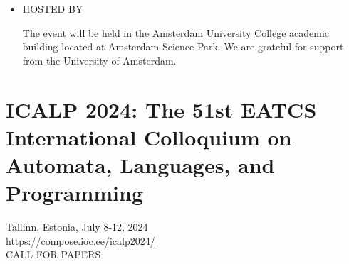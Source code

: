 \documentclass[prodmode,acmtecs]{acmsmall} %
\begin{document}
\begin{itemize}
\item  HOSTED BY 
 
  The event will be held in the Amsterdam University College academic building located at Amsterdam Science Park. We are grateful for support from the University of Amsterdam. 
 
\end{itemize}\section{ICALP 2024: The 51st EATCS International Colloquium on Automata, Languages, and Programming}\label{ICALP2024}  Tallinn, Estonia, July 8-12, 2024\\ 
  \href{https://compose.ioc.ee/icalp2024/}{https://compose.ioc.ee/icalp2024/}\\ 
CALL FOR PAPERS 
\end{document}
